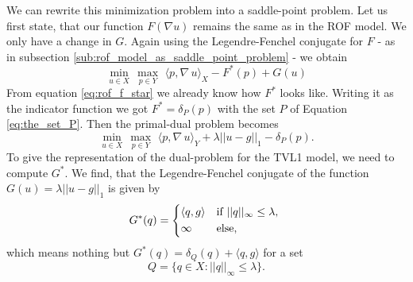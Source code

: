         We can rewrite this minimization problem into a saddle-point problem. Let us first state, that our function $F(\nabla u)$ remains the same as in the ROF model. We only have a change in $G$.
        Again using the Legendre-Fenchel conjugate for $F$ - as in subsection \ref{sub:rof_model_as_saddle_point_problem} - we obtain
            $$
                \min_{u \in X}\, \max_{p \in Y}\,\, \langle p, \nabla \, u \rangle_{X} - F^{\ast}(p) + G(u)%
            $$
        From equation \ref{eq:rof_f_star} we already know how $F^{\ast}$ looks like. Writing it as the indicator function we got $F^{\ast} = \delta_{P}(p)$ with the set $P$ of Equation \ref{eq:the_set_P}. Then the primal-dual problem becomes
            \begin{equation}
                \min_{u \in X}\, \max_{p \in Y}\,\, \langle p, \nabla\, u \rangle_{Y} + \lambda ||u - g||_{1} - \delta_{P}(p).
            \label{eq:primal_dual_tvl1_problem}
            \end{equation}
        To give the representation of the dual-problem for the TVL1 model, we need to compute $G^{\ast}$. We find, that the Legendre-Fenchel conjugate of the function $G(u) = \lambda||u-g||_{1}$ is given by
            \begin{equation}
                G^{\ast}(q) =
                    \begin{dcases*}
                        \langle q, g \rangle & \textnormal{if $||q||_{\infty} \le \lambda$,} \\
                        \infty & \textnormal{else},
                    \end{dcases*}
                \label{eq:tvl1_g_star}
            \end{equation}
        which means nothing but $G^{\ast}(q) = \delta_{Q}(q) + \langle q, g \rangle$ for a set
            \begin{equation}
                Q = \big\{ q \in X : ||q||_{\infty} \le \lambda \big\}.
            \label{eq:the_set_Q}
            \end{equation}

